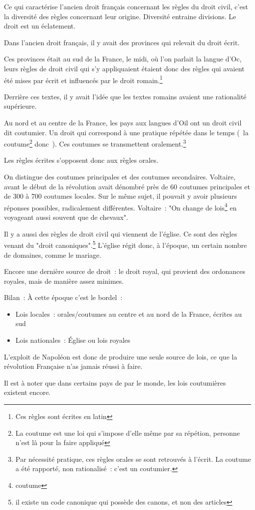 Ce qui caractérise l'ancien droit français concernant les règles du droit civil, c'est la diversité des règles concernant leur origine. Diversité entraine divisions. Le droit est un éclatement.

Dans l'ancien droit français, il y avait des provinces qui relevait du droit écrit. 

Ces provinces était au sud de la France, le midi, où l'on parlait la langue d'Oc, leurs règles de droit civil qui s'y appliquaient étaient donc des règles qui avaient été mises par écrit et influencés par le droit romain.\footnote{Ces règles sont écrites en latin}

Derrière ces textes, il y avait l'idée que les textes romains avaient une rationalité supérieure. 

Au nord et au centre de la France, les pays aux langues d'Oil ont un droit civil dit coutumier. Un droit qui correspond à une pratique répétée dans le temps (~la coutume\footnote{La coutume est une loi qui s'impose d'elle même par sa répétion, personne n'est là pour la faire appliqué} donc~). Ces coutumes se transmettent oralement.\footnote{Par nécessité pratique, ces règles orales se sont retrouvés à l'écrit. La coutume a été rapporté, non rationalisé~: c'est un coutumier.}

Les règles écrites s'opposent donc aux règles orales.

On distingue des coutumes principales et des coutumes secondaires. Voltaire, avant le début de la révolution avait dénombré près de 60 coutumes principales et de 300 à 700 coutumes locales. Sur le même sujet, il pouvait y avoir plusieurs réponses possibles, radicalement différentes. Voltaire~: "On change de lois\footnote{coutume} en voyageant aussi souvent que de chevaux".

Il y a aussi des règles de droit civil qui viennent de l'église. Ce sont des règles venant du "droit canoniques".\footnote{il existe un code canonique qui possède des canons, et non des articles} L'église régit donc, à l'époque, un certain nombre de domaines, comme le mariage.

Encore une dernière source de droit~: le droit royal, qui provient des ordonances royales, mais de manière assez minimes.

Bilan~: À cette époque c'est le bordel~:
\begin{itemize}
\item Lois locales~: orales/coutumes au centre et au nord de la France, écrites au sud
\item Lois nationales~: Église ou lois royales
\end{itemize}

L'exploit de Napoléon est donc de produire une seule source de lois, ce que la révolution Française n'as jamais réussi à faire.

Il est à noter que dans certains pays de par le monde, les lois coutumières existent encore.







